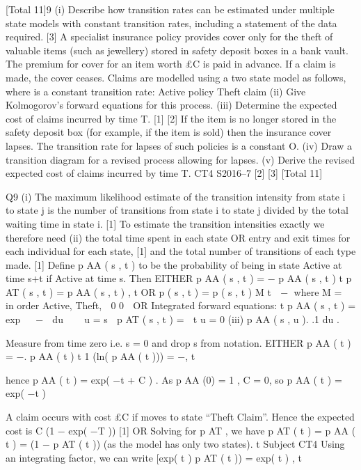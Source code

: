 \documentclass[a4paper,12pt]{article}
\begin{document}
[Total 11]9
(i)
Describe how transition rates can be estimated under multiple state models
with constant transition rates, including a statement of the data required. [3]
A specialist insurance policy provides cover only for the theft of valuable items (such
as jewellery) stored in safety deposit boxes in a bank vault. The premium for cover
for an item worth £C is paid in advance. If a claim is made, the cover ceases.
Claims are modelled using a two state model as follows, where \mu is a constant
transition rate:
\mu
Active
policy
Theft
claim
(ii) Give Kolmogorov’s forward equations for this process.
(iii) Determine the expected cost of claims incurred by time T.
[1]
[2]
If the item is no longer stored in the safety deposit box (for example, if the item is
sold) then the insurance cover lapses. The transition rate for lapses of such policies is
a constant O.
(iv) Draw a transition diagram for a revised process allowing for lapses.
(v) Derive the revised expected cost of claims incurred by time T.
CT4 S2016–7
[2]
[3]
[Total 11]

Q9
(i)
The maximum likelihood estimate of the transition intensity from state i to state j is
the number of transitions from state i to state j divided by the total waiting time in
state i.
[1]
To estimate the transition intensities exactly we therefore need
(ii)
the total time spent in each state
OR
entry and exit times for each individual for each state, [1]
and the total number of transitions of each type made. [1]
Define p AA ( s , t ) to be the probability of being in state Active at time s+t if Active at
time s.
Then EITHER
\partial
p AA ( s , t ) = − p AA ( s , t ) \mu
\partial t 
\partial
p AT ( s , t ) = p AA ( s , t ) \mu ,
\partial t 
OR
\partial
p ( s , t ) = p ( s , t ) M
\partial t 
 −\mu \mu 
where M = 
 in order Active, Theft,
 0 0  
OR
Integrated forward equations:
t
p AA ( s , t ) = exp   −  \mu du  
 u = s

p AT ( s , t ) = 
t
u = 0
(iii)
p AA ( s , u ). \mu .1 du .


Measure from time zero i.e. s = 0 and drop s from notation.
EITHER
\partial
p AA ( t ) = −\mu .
p AA ( t ) \partial t
1
\partial
(ln( p AA ( t ))) = −\mu ,
\partial t

hence p AA ( t ) = exp( −\mu t + C ) .
As p AA (0) = 1 , C = 0, so
p AA ( t ) = exp( −\mu t )

A claim occurs with cost £C if moves to state “Theft Claim”.
Hence the expected cost is C (1 − exp( −\mu T ))
[1]
OR
Solving for p AT , we have
\partial
p AT ( t ) = p AA ( t ) \mu = (1 − p AT ( t )) \mu (as the model has only two states).
\partial t
Subject CT4 %
Using an integrating factor, we can write
\partial
[exp( \mu t ) p AT ( t )) = \mu exp( \mu t ) ,
\partial t
\end{document}
